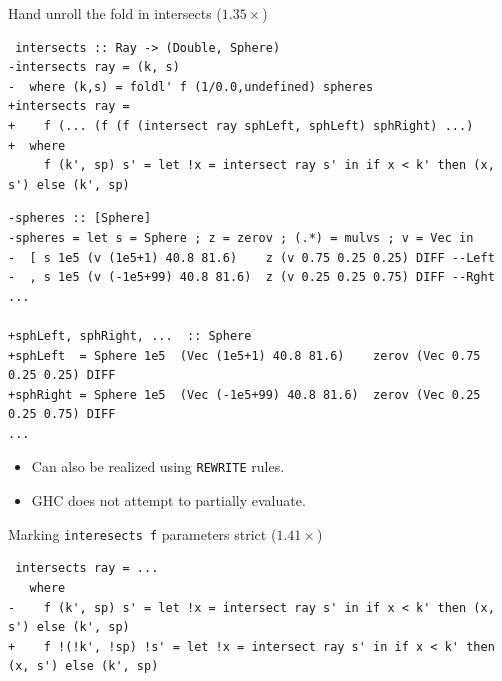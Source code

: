 \documentclass[8pt]{beamer}
\begin{document}
\begin{frame}[fragile]{Hand unroll the fold in intersects ($1.35\times$)}

\begin{verbatim}
 intersects :: Ray -> (Double, Sphere)
-intersects ray = (k, s)
-  where (k,s) = foldl' f (1/0.0,undefined) spheres
+intersects ray =
+    f (... (f (f (intersect ray sphLeft, sphLeft) sphRight) ...)
+  where
     f (k', sp) s' = let !x = intersect ray s' in if x < k' then (x, s') else (k', sp)
\end{verbatim}


\begin{verbatim}
-spheres :: [Sphere]
-spheres = let s = Sphere ; z = zerov ; (.*) = mulvs ; v = Vec in
-  [ s 1e5 (v (1e5+1) 40.8 81.6)    z (v 0.75 0.25 0.25) DIFF --Left
-  , s 1e5 (v (-1e5+99) 40.8 81.6)  z (v 0.25 0.25 0.75) DIFF --Rght
...

+sphLeft, sphRight, ...  :: Sphere
+sphLeft  = Sphere 1e5  (Vec (1e5+1) 40.8 81.6)    zerov (Vec 0.75 0.25 0.25) DIFF
+sphRight = Sphere 1e5  (Vec (-1e5+99) 40.8 81.6)  zerov (Vec 0.25 0.25 0.75) DIFF
...
\end{verbatim}

 \begin{itemize}
 \item Can also be realized using \texttt{REWRITE} rules.
 \item GHC does not attempt to partially evaluate.
 \end{itemize}

\end{frame}

\begin{frame}[fragile]{Marking \texttt{interesects f} parameters strict ($1.41\times$)}
\begin{verbatim}
 intersects ray = ...
   where
-    f (k', sp) s' = let !x = intersect ray s' in if x < k' then (x, s') else (k', sp)
+    f !(!k', !sp) !s' = let !x = intersect ray s' in if x < k' then (x, s') else (k', sp)
\end{verbatim}
\end{frame}

\end{document}
